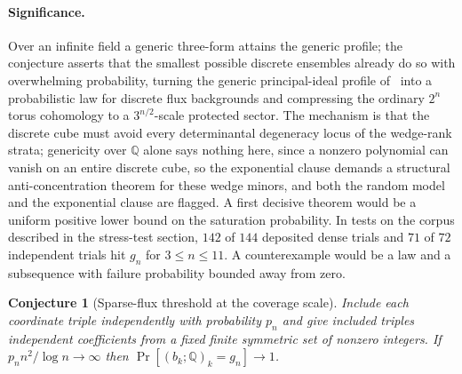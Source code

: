 \documentclass[11pt]{article}
\newtheorem{conjecture}{Conjecture}
\theoremstyle{definition}
\newcommand{\Q}{\mathbb Q}
\providecommand{\Q}{\mathbb Q}
\begin{document}
\paragraph{Significance.}
Over an infinite field a generic three-form attains the generic profile; the conjecture asserts that the smallest possible discrete ensembles already do so with overwhelming probability, turning the generic principal-ideal profile of~\cite{LN19} into a probabilistic law for discrete flux backgrounds and compressing the ordinary $2^n$ torus cohomology to a $3^{n/2}$-scale protected sector.  The mechanism is that the discrete cube must avoid every determinantal degeneracy locus of the wedge-rank strata; genericity over $\Q$ alone says nothing here, since a nonzero polynomial can vanish on an entire discrete cube, so the exponential clause demands a structural anti-concentration theorem for these wedge minors, and both the random model and the exponential clause are flagged.  A first decisive theorem would be a uniform positive lower bound on the saturation probability.  In tests on the corpus described in the stress-test section, $142$ of $144$ deposited dense trials and $71$ of $72$ independent trials hit $g_n$ for $3\le n\le11$.  A counterexample would be a law and a subsequence with failure probability bounded away from zero.

\begin{conjecture}[Sparse-flux threshold at the coverage scale]\label{aa2}
Include each coordinate triple independently with probability $p_n$ and give included triples independent coefficients from a fixed finite symmetric set of nonzero integers.  If $p_nn^2/\log n\to\infty$ then $\Pr[(b_k;\mathbb Q)_k=g_n]\to1$.
\end{conjecture}
\end{document}
